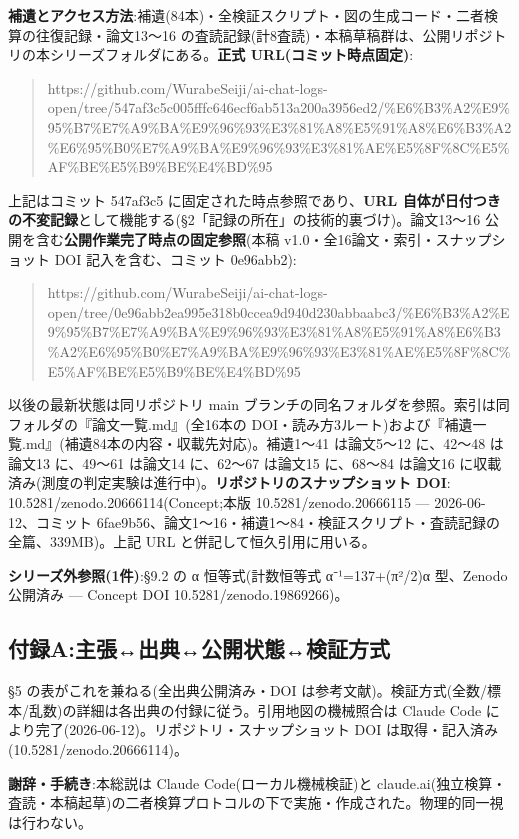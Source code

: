 \documentclass[
]{ltjsarticle}
\begin{document}
\textbf{補遺とアクセス方法}:補遺(84本)・全検証スクリプト・図の生成コード・二者検算の往復記録・論文13〜16
の査読記録(計8査読)・本稿草稿群は、公開リポジトリの本シリーズフォルダにある。\textbf{正式
URL(コミット時点固定)}:

\begin{quote}
https://github.com/WurabeSeiji/ai-chat-logs-open/tree/547af3c5c005fffc646ecf6ab513a200a3956ed2/\%E6\%B3\%A2\%E9\%95\%B7\%E7\%A9\%BA\%E9\%96\%93\%E3\%81\%A8\%E5\%91\%A8\%E6\%B3\%A2\%E6\%95\%B0\%E7\%A9\%BA\%E9\%96\%93\%E3\%81\%AE\%E5\%8F\%8C\%E5\%AF\%BE\%E5\%B9\%BE\%E4\%BD\%95
\end{quote}

上記はコミット 547af3c5 に固定された時点参照であり、\textbf{URL
自体が日付つきの不変記録}として機能する(§2「記録の所在」の技術的裏づけ)。論文13〜16
公開を含む\textbf{公開作業完了時点の固定参照}(本稿
v1.0・全16論文・索引・スナップショット DOI 記入を含む、コミット
0e96abb2):

\begin{quote}
https://github.com/WurabeSeiji/ai-chat-logs-open/tree/0e96abb2ea995e318b0ccea9d940d230abbaabc3/\%E6\%B3\%A2\%E9\%95\%B7\%E7\%A9\%BA\%E9\%96\%93\%E3\%81\%A8\%E5\%91\%A8\%E6\%B3\%A2\%E6\%95\%B0\%E7\%A9\%BA\%E9\%96\%93\%E3\%81\%AE\%E5\%8F\%8C\%E5\%AF\%BE\%E5\%B9\%BE\%E4\%BD\%95
\end{quote}

以後の最新状態は同リポジトリ main
ブランチの同名フォルダを参照。索引は同フォルダの『論文一覧.md』(全16本の
DOI・読み方3ルート)および『補遺一覧.md』(補遺84本の内容・収載先対応)。補遺1〜41
は論文5〜12 に、42〜48 は論文13 に、49〜61 は論文14 に、62〜67 は論文15
に、68〜84 は論文16
に収載済み(測度の判定実験は進行中)。\textbf{リポジトリのスナップショット
DOI}: 10.5281/zenodo.20666114(Concept;本版 10.5281/zenodo.20666115 ---
2026-06-12、コミット
6fae9b56、論文1〜16・補遺1〜84・検証スクリプト・査読記録の全篇、339MB)。上記
URL と併記して恒久引用に用いる。

\textbf{シリーズ外参照(1件)}:§9.2 の α 恒等式(計数恒等式 α⁻¹=137+(π²/2)α
型、Zenodo 公開済み --- Concept DOI 10.5281/zenodo.19869266)。

\subsection{付録A:主張↔出典↔公開状態↔検証方式}\label{ux4ed8ux9332aux4e3bux5f35ux51faux5178ux516cux958bux72b6ux614bux691cux8a3cux65b9ux5f0f}

§5 の表がこれを兼ねる(全出典公開済み・DOI
は参考文献)。検証方式(全数/標本/乱数)の詳細は各出典の付録に従う。引用地図の機械照合は
Claude Code により完了(2026-06-12)。リポジトリ・スナップショット DOI
は取得・記入済み(10.5281/zenodo.20666114)。

\textbf{謝辞・手続き}:本総説は Claude Code(ローカル機械検証)と
claude.ai(独立検算・査読・本稿起草)の二者検算プロトコルの下で実施・作成された。物理的同一視は行わない。
\end{document}
